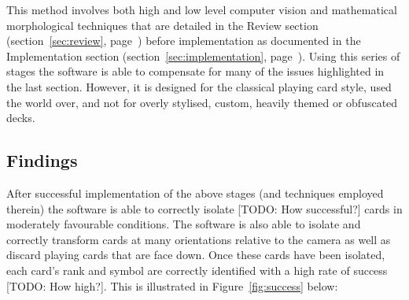 \documentclass[a4paper,12pt,notitlepage]{article}
\newcommand{\secref}[1]{(section~\ref{#1}, page~\pageref{#1})}
\begin{document}
		This method involves both high and low level computer vision and mathematical morphological techniques that are detailed in the Review section \secref{sec:review} before implementation as documented in the Implementation section \secref{sec:implementation}. Using this series of stages the software is able to compensate for many of the issues highlighted in the last section. However, it is designed for the classical playing card style, used the world over, and not for overly stylised, custom, heavily themed or obfuscated decks.
	\subsection{Findings}
		After successful implementation of the above stages (and techniques employed therein) the software is able to correctly isolate [TODO: How successful?] cards in moderately favourable conditions. The software is also able to isolate and correctly transform cards at many orientations relative to the camera as well as discard playing cards that are face down. Once these cards have been isolated, each card's rank and symbol are correctly identified with a high rate of success [TODO: How high?]. This is illustrated in Figure~\ref{fig:success} below:
\end{document}
